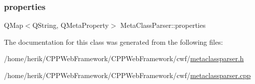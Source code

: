 \mbox{\label{class_meta_class_parser_ac79cc08f53b738fdb4e3c57d48474ac8}} 
\subsubsection{\texorpdfstring{properties}{properties}}
{\footnotesize\ttfamily Q\+Map$<$Q\+String, Q\+Meta\+Property$>$ Meta\+Class\+Parser\+::properties}



The documentation for this class was generated from the following files\+:\begin{DoxyCompactItemize}
\item 
/home/herik/\+C\+P\+P\+Web\+Framework/\+C\+P\+P\+Web\+Framework/cwf/\hyperlink{metaclassparser_8h}{metaclassparser.\+h}\item 
/home/herik/\+C\+P\+P\+Web\+Framework/\+C\+P\+P\+Web\+Framework/cwf/\hyperlink{metaclassparser_8cpp}{metaclassparser.\+cpp}\end{DoxyCompactItemize}
